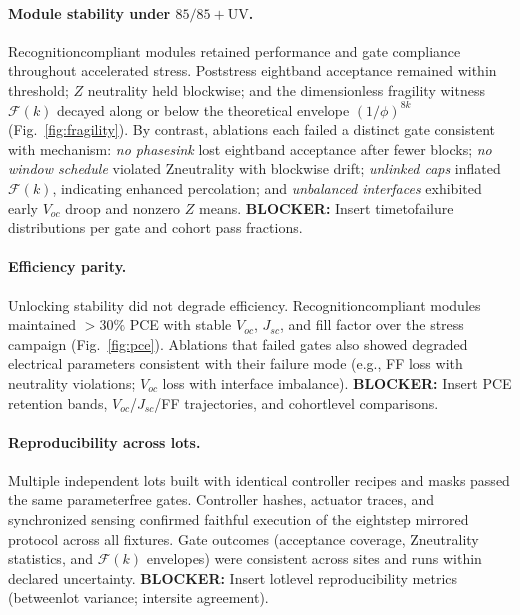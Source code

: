 \documentclass[12pt]{article}
\begin{document}
\paragraph{Module stability under $85/85+\mathrm{UV}$.}
Recognition\textendash compliant modules retained performance and gate compliance throughout accelerated stress. Post\textendash stress eight\textendash band acceptance remained within threshold; $Z$ neutrality held blockwise; and the dimensionless fragility witness $\mathcal{F}(k)$ decayed along or below the theoretical envelope $(1/\phi)^{8k}$ (Fig.~\ref{fig:fragility}). By contrast, ablations each failed a distinct gate consistent with mechanism: \emph{no phase\textendash sink} lost eight\textendash band acceptance after fewer blocks; \emph{no window schedule} violated Z\textendash neutrality with blockwise drift; \emph{unlinked caps} inflated $\mathcal{F}(k)$, indicating enhanced percolation; and \emph{unbalanced interfaces} exhibited early $V_{\!oc}$ droop and nonzero $Z$ means. 
\textbf{BLOCKER:} Insert time\textendash to\textendash failure distributions per gate and cohort pass fractions.

\paragraph{Efficiency parity.}
Unlocking stability did not degrade efficiency. Recognition\textendash compliant modules maintained $>30\%$ PCE with stable $V_{\!oc}$, $J_{\!sc}$, and fill factor over the stress campaign (Fig.~\ref{fig:pce}). Ablations that failed gates also showed degraded electrical parameters consistent with their failure mode (e.g., FF loss with neutrality violations; $V_{\!oc}$ loss with interface imbalance). 
\textbf{BLOCKER:} Insert PCE retention bands, $V_{\!oc}$/$J_{\!sc}$/FF trajectories, and cohort\textendash level comparisons.

\paragraph{Reproducibility across lots.}
Multiple independent lots built with identical controller recipes and masks passed the same parameter\textendash free gates. Controller hashes, actuator traces, and synchronized sensing confirmed faithful execution of the eight\textendash step mirrored protocol across all fixtures. Gate outcomes (acceptance coverage, Z\textendash neutrality statistics, and $\mathcal{F}(k)$ envelopes) were consistent across sites and runs within declared uncertainty. 
\textbf{BLOCKER:} Insert lot\textendash level reproducibility metrics (between\textendash lot variance; inter\textendash site agreement).
\end{document}
